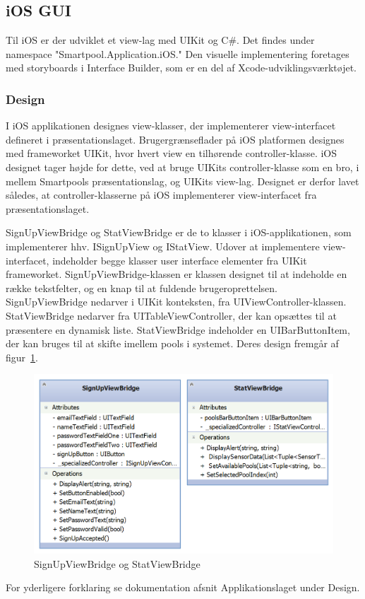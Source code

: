 \subsection{iOS GUI}
Til iOS er der udviklet et view-lag med UIKit og C\#. Det findes under namespace "Smartpool.Application.iOS."
Den visuelle implementering foretages med storyboards i Interface Builder, som er en del af Xcode-udviklingsværktøjet.

\subsubsection{Design}
I iOS applikationen designes view-klasser, der implementerer view-interfacet defineret i præsentationslaget. Brugergrænseflader på iOS platformen designes med frameworket UIKit, hvor hvert view en tilhørende controller-klasse. iOS designet tager højde for dette, ved at bruge UIKits controller-klasse som en bro, i mellem Smartpools præsentationslag, og UIKits view-lag. Designet er derfor lavet således, at controller-klasserne på iOS implementerer view-interfacet fra præsentationslaget.

SignUpViewBridge og StatViewBridge er de to klasser i iOS-applikationen, som implementerer hhv. ISignUpView og IStatView. Udover at implementere view-interfacet, indeholder begge klasser user interface elementer fra UIKit frameworket. SignUpViewBridge-klassen er klassen designet til at indeholde en række tekstfelter, og en knap til at fuldende brugeroprettelsen. SignUpViewBridge nedarver i UIKit konteksten, fra UIViewController-klassen. StatViewBridge nedarver fra UITableViewController, der kan opsættes til at præsentere en dynamisk liste. StatViewBridge indeholder en UIBarButtonItem, der kan bruges til at skifte imellem pools i systemet. Deres design fremgår af figur~\ref{fig:ios_viewbridges}.

\begin{figure}
	\centering
	\includegraphics[width=0.7\linewidth]{figs/design/ios_viewbridges}
	\caption{SignUpViewBridge og StatViewBridge}
	\label{fig:ios_viewbridges}
\end{figure}

For yderligere forklaring se dokumentation afsnit Applikationslaget under Design.